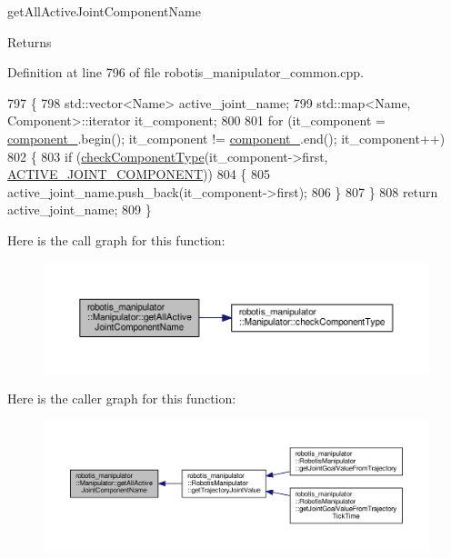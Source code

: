 get\+All\+Active\+Joint\+Component\+Name 

\begin{DoxyReturn}{Returns}

\end{DoxyReturn}


Definition at line 796 of file robotis\+\_\+manipulator\+\_\+common.\+cpp.


\begin{DoxyCode}
797 \{
798   std::vector<Name> active\_joint\_name;
799   std::map<Name, Component>::iterator it\_component;
800 
801   \textcolor{keywordflow}{for} (it\_component = \hyperlink{classrobotis__manipulator_1_1_manipulator_a20b388b821f161972c2cf737fe1c26db}{component\_}.begin(); it\_component != \hyperlink{classrobotis__manipulator_1_1_manipulator_a20b388b821f161972c2cf737fe1c26db}{component\_}.end(); 
      it\_component++)
802   \{
803     \textcolor{keywordflow}{if} (\hyperlink{classrobotis__manipulator_1_1_manipulator_a5b1f27b9cc2875b4e0275e3b88ab1b28}{checkComponentType}(it\_component->first, 
      \hyperlink{namespacerobotis__manipulator_a2bbf89d1c08dc1d9ff4e28beb939e382acdf3b34914d1a2a028d882beb96fba7c}{ACTIVE\_JOINT\_COMPONENT}))
804     \{
805       active\_joint\_name.push\_back(it\_component->first);
806     \}
807   \}
808   \textcolor{keywordflow}{return} active\_joint\_name;
809 \}
\end{DoxyCode}


Here is the call graph for this function\+:\nopagebreak
\begin{figure}[H]
\begin{center}
\leavevmode
\includegraphics[width=350pt]{classrobotis__manipulator_1_1_manipulator_af746f90412f3a1f08dee32a855ca177c_cgraph}
\end{center}
\end{figure}




Here is the caller graph for this function\+:\nopagebreak
\begin{figure}[H]
\begin{center}
\leavevmode
\includegraphics[width=350pt]{classrobotis__manipulator_1_1_manipulator_af746f90412f3a1f08dee32a855ca177c_icgraph}
\end{center}
\end{figure}


